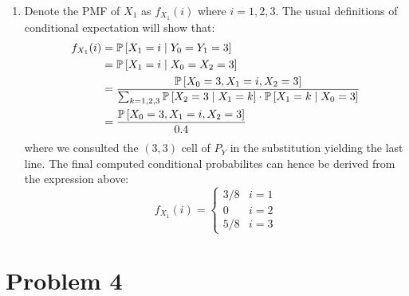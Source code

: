 \documentclass[12pt]{article}%
\begin{document}
\begin{enumerate}
  \item
        Denote the PMF of $X_{1}$ as $f_{X_{1}}(i)$ where $i=1,2,3$. The usual definitions of conditional expectation will show that:
%
        \begin{align*}
          f_{X_{1}}(i) & =  \mathbb{P}\left[X_1 = i \mid Y_0 = Y_1 = 3\right] \\
                       & = \mathbb{P}\left[X_1 = i \mid X_0 = X_2 = 3\right] \\
                       & = \frac{\mathbb{P}\left[X_{0} = 3, X_{1} = i, X_{2} = 3\right]}{\sum_{k=1,2,3} \mathbb{P}\left[X_{2} = 3 \mid X_{1} = k\right] \cdot \mathbb{P}\left[X_{1} = k \mid X_{0} = 3\right]} \\
                        & = \frac{\mathbb{P}\left[X_{0} = 3, X_{1} = i, X_{2} = 3\right]}{0.4}\\
        \end{align*}
%
        where we consulted the $(3,3)$ cell of $P_{Y}$ in the substitution yielding the last line. The final computed conditional probabilites can hence be derived from the expression above:
%
        \[f_{X_1}(i) = \begin{cases}
                         3/8 & i = 1 \\
                         0 & i = 2 \\
                         5/8 & i = 3
                       \end{cases}\]

\end{enumerate}


\section{Problem 4}%
\label{sec:problem-4}
\end{document}
